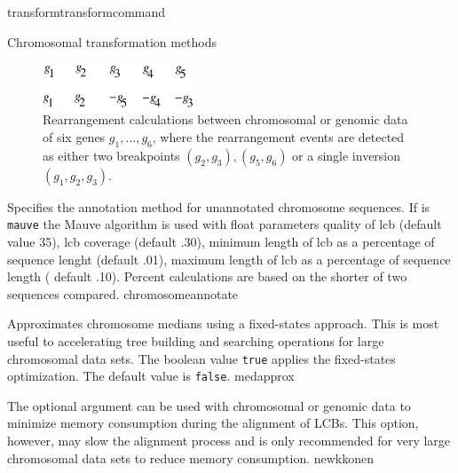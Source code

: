 \begin{command}{transform}{transformcommand}
\begin{arguments}
\begin{argumentgroup}{Chromosomal transformation methods}
		\begin{figure}[!htbp]
		\begin{center}
        		\includegraphics[width=0.4\textwidth]{doc/figures/breakpointDis.pdf}
      		\end{center}
		  \caption{Rearrangement calculations between chromosomal or genomic data of six genes $g_1, \ldots, g_6$,
                 	 where the rearrangement events are detected as either two breakpoints $(g_2, g_3), (g_5, g_6)$
                   or a single inversion $(g_1, g_2, g_3)$.}
                   \label{fig:distance}
		\end{figure}
		
	\begin{description}
                        {Specifies the annotation method for unannotated chromosome sequences.
                        If \poylident is \texttt{mauve} the Mauve algorithm is used \cite{darlingetal2004} with
                        float parameters quality of lcb (default value 35), lcb coverage (default .30), 
                        minimum length of lcb as a percentage of sequence lenght (default .01), maximum length of lcb as a percentage of 
                        sequence length ( default .10).  Percent calculations are based on the shorter of two sequences compared.}
                        {chromosomeannotate}

                        {Approximates chromosome medians using a fixed-states
                        approach. This is most useful to accelerating tree
                        building and searching operations for large chromosomal
                        data sets. The boolean value \texttt{true} applies the
                        fixed-states optimization. The default value is
                        \texttt{false}.}
                        {medapprox}
                        
                        {The optional  argument can be used with chromosomal or genomic data to minimize memory 
                        consumption during the alignment of LCBs.  This option, however, may slow the alignment process and is only 
                        recommended for very large chromosomal data sets to reduce memory consumption.}
                        {newkkonen}
                        

\end{description}
\end{argumentgroup}
\end{arguments}
\end{command}
